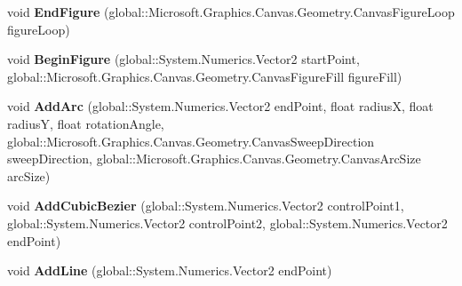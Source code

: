 \begin{DoxyCompactItemize}
\item 
\mbox{\label{interface_microsoft_1_1_graphics_1_1_canvas_1_1_geometry_1_1_i_canvas_path_receiver_acad2c777502ab1ccf0c33ff63873a7c9}} 
void {\bfseries End\+Figure} (global\+::\+Microsoft.\+Graphics.\+Canvas.\+Geometry.\+Canvas\+Figure\+Loop figure\+Loop)
\item 
\mbox{\label{interface_microsoft_1_1_graphics_1_1_canvas_1_1_geometry_1_1_i_canvas_path_receiver_aef7e5c282cbb5cd2800c4626abdf7981}} 
void {\bfseries Begin\+Figure} (global\+::\+System.\+Numerics.\+Vector2 start\+Point, global\+::\+Microsoft.\+Graphics.\+Canvas.\+Geometry.\+Canvas\+Figure\+Fill figure\+Fill)
\item 
\mbox{\label{interface_microsoft_1_1_graphics_1_1_canvas_1_1_geometry_1_1_i_canvas_path_receiver_a50a4758a3ed76ce6c8cd9868b31e29cf}} 
void {\bfseries Add\+Arc} (global\+::\+System.\+Numerics.\+Vector2 end\+Point, float radiusX, float radiusY, float rotation\+Angle, global\+::\+Microsoft.\+Graphics.\+Canvas.\+Geometry.\+Canvas\+Sweep\+Direction sweep\+Direction, global\+::\+Microsoft.\+Graphics.\+Canvas.\+Geometry.\+Canvas\+Arc\+Size arc\+Size)
\item 
\mbox{\label{interface_microsoft_1_1_graphics_1_1_canvas_1_1_geometry_1_1_i_canvas_path_receiver_ab770bd039e07f19239a6f9f563ccd042}} 
void {\bfseries Add\+Cubic\+Bezier} (global\+::\+System.\+Numerics.\+Vector2 control\+Point1, global\+::\+System.\+Numerics.\+Vector2 control\+Point2, global\+::\+System.\+Numerics.\+Vector2 end\+Point)
\item 
\mbox{\label{interface_microsoft_1_1_graphics_1_1_canvas_1_1_geometry_1_1_i_canvas_path_receiver_af4c3299bef8e5d0a0d801f7e730857f9}} 
void {\bfseries Add\+Line} (global\+::\+System.\+Numerics.\+Vector2 end\+Point)
\item 
\mbox{\label{interface_microsoft_1_1_graphics_1_1_canvas_1_1_geometry_1_1_i_canvas_path_receiver_a782bc874c27fca70636c3657fbd63fb8}} 

\end{DoxyCompactItemize}

